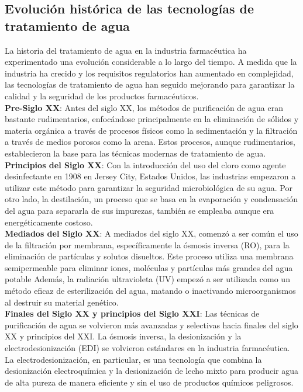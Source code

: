 \subsection{Evolución histórica de las tecnologías de tratamiento de agua}

La historia del tratamiento de agua en la industria farmacéutica ha experimentado una evolución considerable a lo largo del tiempo. A medida que la industria ha crecido y los requisitos regulatorios han aumentado en complejidad, las tecnologías de tratamiento de agua han seguido mejorando para garantizar la calidad y la seguridad de los productos farmacéuticos.\\


\textbf{Pre-Siglo XX}: Antes del siglo XX, los métodos de purificación de agua eran bastante rudimentarios, enfocándose principalmente en la eliminación de sólidos y materia orgánica a través de procesos físicos como la sedimentación y la filtración a través de medios porosos como la arena. Estos procesos, aunque rudimentarios, establecieron la base para las técnicas modernas de tratamiento de agua.\\

\textbf{Principios del Siglo XX}: Con la introducción del uso del cloro como agente desinfectante en 1908 en Jersey City, Estados Unidos, las industrias empezaron a utilizar este método para garantizar la seguridad microbiológica de su agua. Por otro lado, la destilación, un proceso que se basa en la evaporación y condensación del agua para separarla de sus impurezas, también se empleaba aunque era energéticamente costoso.\\

\textbf{Mediados del Siglo XX}: A mediados del siglo XX, comenzó a ser común el uso de la filtración por membrana, específicamente la ósmosis inversa (RO), para la eliminación de partículas y solutos disueltos. Este proceso utiliza una membrana semipermeable para eliminar iones, moléculas y partículas más grandes del agua potable Además, la radiación ultravioleta (UV) empezó a ser utilizada como un método eficaz de esterilización del agua, matando o inactivando microorganismos al destruir su material genético.\\

\textbf{Finales del Siglo XX y principios del Siglo XXI}: Las técnicas de purificación de agua se volvieron más avanzadas y selectivas hacia finales del siglo XX y principios del XXI. La ósmosis inversa, la desionización y la electrodesionización (EDI) se volvieron estándares en la industria farmacéutica. La electrodesionización, en particular, es una tecnología que combina la desionización electroquímica y la desionización de lecho mixto para producir agua de alta pureza de manera eficiente y sin el uso de productos químicos peligrosos.\\


